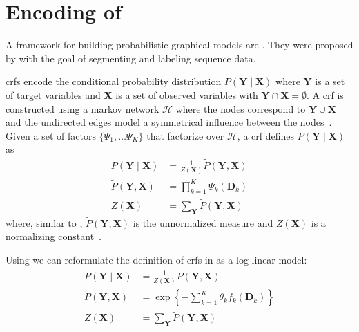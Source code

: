 \section{Encoding of }\label{sec:definition-crfs}
A framework for building \glspl{probabilistic graphical model} are .
They were proposed by \citet{lafferty2001conditional} with the goal of segmenting and labeling sequence data.

\bigskip

\Glspl{crf} encode the \gls{conditional probability distribution} $P(\bm{Y}\mid\bm{X})$ where $\bm{Y}$ is a set of \glspl{target variable} and $\bm{X}$ is a set of \glspl{observed variable} with $\bm{Y}\cap\bm{X}=\emptyset$.
A \gls{crf} is constructed using a \gls{markov network} $\mathcal{H}$ where the nodes correspond to $\bm{Y}\cup\bm{X}$ and the undirected edges model a symmetrical influence between the nodes~\citep{koller2009probabilistic}.
Given a set of \glspl{factor} $\{\Psi_1,\dots\Psi_K\}$ that factorize over $\mathcal{H}$, a \gls{crf} defines $P(\bm{Y}\mid\bm{X})$ as~\citep{koller2009probabilistic}
\begin{equation}
  \label{equ:crf-factor}
  \begin{split}
    P(\bm{Y}\mid\bm{X}) & = \frac{1}{Z(\bm{X})}\tilde{P}(\bm{Y},\bm{X}) \\
    \tilde{P}(\bm{Y},\bm{X}) &= \prod_{k=1}^{K}\Psi_k(\bm{D}_k) \\
    Z(\bm{X}) & = \sum_{\bm{Y}}\tilde{P}(\bm{Y},\bm{X})
  \end{split}
\end{equation}
where, similar to , $\tilde{P}(\bm{Y},\bm{X})$ is the unnormalized measure and $Z(\bm{X})$ is a normalizing constant~\citep{koller2009probabilistic}.

\bigskip

Using  we can reformulate the definition of \glspl{crf} in  as a \gls{log-linear model}:
\begin{equation}
  \label{equ:crf-log-linear}
  \begin{split}
    P(\bm{Y}\mid\bm{X}) & = \frac{1}{Z(\bm{X})}\tilde{P}(\bm{Y},\bm{X}) \\
    \tilde{P}(\bm{Y},\bm{X}) & = \exp\left\{ -\sum_{k=1}^K \theta_k f_k(\bm{D}_k)\right\} \\
    Z(\bm{X}) & = \sum_{\bm{Y}}\tilde{P}(\bm{Y},\bm{X})
  \end{split}
\end{equation}

